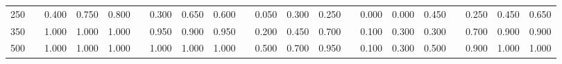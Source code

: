 % 
\begin{tabular}{ccccccccccccccccccccc}
  \hline
  \hline
250 &  & 0.400 & 0.750 & 0.800 &  & 0.300 & 0.650 & 0.600 &  & 0.050 & 0.300 & 0.250 &  & 0.000 & 0.000 & 0.450 &  & 0.250 & 0.450 & 0.650 \\ 
  350 &  & 1.000 & 1.000 & 1.000 &  & 0.950 & 0.900 & 0.950 &  & 0.200 & 0.450 & 0.700 &  & 0.100 & 0.300 & 0.300 &  & 0.700 & 0.900 & 0.900 \\ 
  500 &  & 1.000 & 1.000 & 1.000 &  & 1.000 & 1.000 & 1.000 &  & 0.500 & 0.700 & 0.950 &  & 0.100 & 0.300 & 0.500 &  & 0.900 & 1.000 & 1.000 \\ 
   \hline
\end{tabular}
